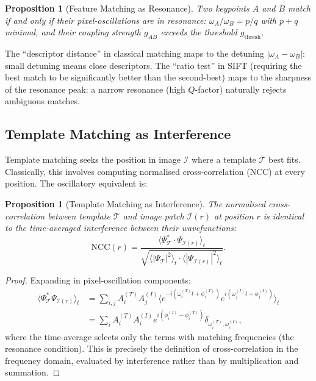 \documentclass[11pt,twocolumn,a4paper]{article}
\newtheorem{proposition}[theorem]{Proposition}
\begin{document}
\begin{proposition}[Feature Matching as Resonance]\label{prop:feature_resonance}
Two keypoints $A$ and $B$ match if and only if their pixel-oscillations are in resonance: $\omega_A / \omega_B = p/q$ with $p + q$ minimal, and their coupling strength $g_{AB}$ exceeds the threshold $g_{\text{thresh}}$.
\end{proposition}

The ``descriptor distance'' in classical matching maps to the detuning $|\omega_A - \omega_B|$: small detuning means close descriptors. The ``ratio test'' in SIFT (requiring the best match to be significantly better than the second-best) maps to the sharpness of the resonance peak: a narrow resonance (high $Q$-factor) naturally rejects ambiguous matches.

\subsection{Template Matching as Interference}

Template matching seeks the position in image $\mathcal{I}$ where a template $\mathcal{T}$ best fits. Classically, this involves computing normalised cross-correlation (NCC) at every position. The oscillatory equivalent is:

\begin{proposition}[Template Matching as Interference]\label{prop:template_interference}
The normalised cross-correlation between template $\mathcal{T}$ and image patch $\mathcal{I}(r)$ at position $r$ is identical to the time-averaged interference between their wavefunctions:
\begin{equation}
    \text{NCC}(r) = \frac{\langle \Psi_{\mathcal{T}}^* \cdot \Psi_{\mathcal{I}(r)} \rangle_t}{\sqrt{\langle |\Psi_{\mathcal{T}}|^2 \rangle_t \cdot \langle |\Psi_{\mathcal{I}(r)}|^2 \rangle_t}}.
    \label{eq:ncc_interference}
\end{equation}
\end{proposition}

\begin{proof}
Expanding in pixel-oscillation components:
\begin{align}
    \langle \Psi_{\mathcal{T}}^* \Psi_{\mathcal{I}(r)} \rangle_t &= \sum_{i,j} A_i^{(T)} A_j^{(I)} \langle e^{-i(\omega_i^{(T)} t + \phi_i^{(T)})} e^{i(\omega_j^{(I)} t + \phi_j^{(I)})} \rangle_t \nonumber \\
    &= \sum_{i} A_i^{(T)} A_i^{(I)} e^{i(\phi_i^{(I)} - \phi_i^{(T)})} \delta_{\omega_i^{(T)}, \omega_i^{(I)}},
    \label{eq:ncc_expansion}
\end{align}
where the time-average selects only the terms with matching frequencies (the resonance condition). This is precisely the definition of cross-correlation in the frequency domain, evaluated by interference rather than by multiplication and summation.
\end{proof}
\end{document}
